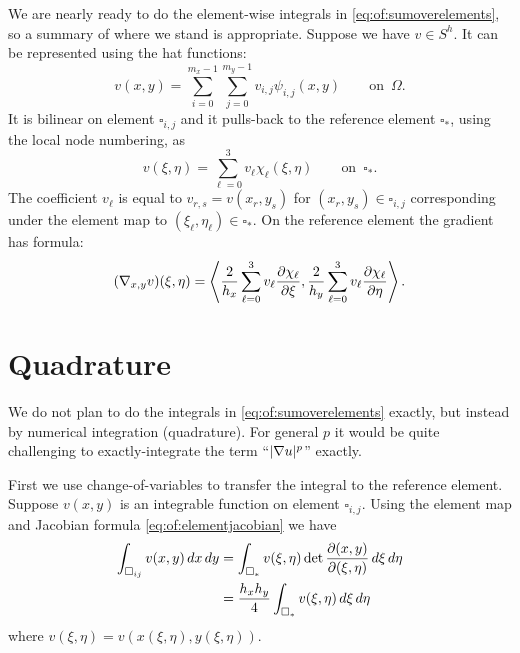 We are nearly ready to do the element-wise integrals in \eqref{eq:of:sumoverelements}, so a summary of where we stand is appropriate.  Suppose we have $v \in S^h$.  It can be represented using the hat functions:
\begin{equation}
v(x,y) = \sum_{i=0}^{m_x-1} \sum_{j=0}^{m_y-1} v_{i,j} \psi_{i,j}(x,y)  \qquad \text{on } \,\Omega. \label{eq:of:bilinearrepresentation}
\end{equation}
It is bilinear on element $\square_{i,j}$ and it pulls-back to the reference element $\square_\ast$, using the local node numbering, as
\begin{equation}
v(\xi,\eta) = \sum_{\ell=0}^3 v_\ell \chi_\ell(\xi,\eta)  \qquad \text{on } \,\square_\ast. \label{eq:of:bilinearref}
\end{equation}
The coefficient $v_\ell$ is equal to $v_{r,s} = v(x_r,y_s)$ for $(x_r,y_s)\in\square_{i,j}$ corresponding under the element map to $(\xi_\ell,\eta_\ell) \in \square_\ast$.  On the reference element the gradient has formula:
\begin{equation}
  (\nabla_{x,y} v)(\xi,\eta) = \left<\frac{2}{h_x} \sum_{\ell=0}^3 v_\ell \frac{\partial\chi_\ell}{\partial \xi}, \frac{2}{h_y} \sum_{\ell=0}^3 v_\ell \frac{\partial\chi_\ell}{\partial \eta}\right>. \label{eq:of:gradrepref}
\end{equation}


\section{Quadrature}

We do not plan to do the integrals in \eqref{eq:of:sumoverelements} exactly, but instead by numerical integration (quadrature).  For general $p$ it would be quite challenging to exactly-integrate the term ``$|\nabla u|^p$'' exactly.

First we use change-of-variables to transfer the integral to the reference element.  Suppose $v(x,y)$ is an integrable function on element $\square_{i,j}$.  Using the element map and Jacobian formula \eqref{eq:of:elementjacobian} we have
\begin{align}
\int_{\square_{ij}} v(x,y)\,dx\,dy &= \int_{\square_\ast} v(\xi,\eta) \det\frac{\partial(x,y)}{\partial(\xi,\eta)}\,d\xi\,d\eta  \notag \\
&= \frac{h_x h_y}{4} \int_{\square_\ast} v(\xi,\eta) \,d\xi\,d\eta \label{eq:of:changeofvars}
\end{align}
where $v(\xi,\eta)=v(x(\xi,\eta),y(\xi,\eta))$.

